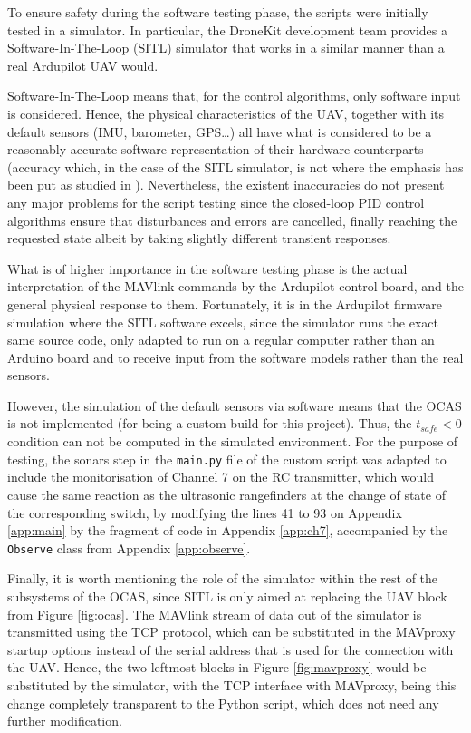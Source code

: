 To ensure safety during the software testing phase, the scripts were initially tested in a simulator.
In particular, the DroneKit development team provides a Software-In-The-Loop (SITL) simulator that works in a similar manner than a real Ardupilot UAV would.

Software-In-The-Loop means that, for the control algorithms, only software input is considered.
Hence, the physical characteristics of the UAV, together with its default sensors (IMU, barometer, GPS\ldots) all have what is considered to be a reasonably accurate software representation of their hardware counterparts (accuracy which, in the case of the SITL simulator, is not where the emphasis has been put as studied in \cite{vegaastorga2016}).
Nevertheless, the existent inaccuracies do not present any major problems for the script testing since the closed-loop PID control algorithms ensure that disturbances and errors are cancelled, finally reaching the requested state albeit by taking slightly different transient responses.

What is of higher importance in the software testing phase is the actual interpretation of the MAVlink commands by the Ardupilot control board, and the general physical response to them.
Fortunately, it is in the Ardupilot firmware simulation where the SITL software excels, since the simulator runs the exact same source code, only adapted to run on a regular computer rather than an Arduino board and to receive input from the software models rather than the real sensors.

However, the simulation of the default sensors via software means that the OCAS is not implemented (for being a custom build for this project).
Thus, the $t_{safe}<0$ condition can not be computed in the simulated environment.
For the purpose of testing, the sonars step in the \texttt{main.py} file of the custom script was adapted to include the monitorisation of Channel 7 on the RC transmitter, which would cause the same reaction as the ultrasonic rangefinders at the change of state of the corresponding switch, by modifying the lines 41 to 93 on Appendix \ref{app:main} by the fragment of code in Appendix \ref{app:ch7}, accompanied by the \texttt{Observe} class from Appendix \ref{app:observe}.

Finally, it is worth mentioning the role of the simulator within the rest of the subsystems of the OCAS, since SITL is only aimed at replacing the UAV block from Figure \ref{fig:ocas}.
The MAVlink stream of data out of the simulator is transmitted using the TCP protocol, which can be substituted in the MAVproxy startup options instead of the serial address that is used for the connection with the UAV.
Hence, the two leftmost blocks in Figure \ref{fig:mavproxy} would be substituted by the simulator, with the TCP interface with MAVproxy, being this change completely transparent to the Python script, which does not need any further modification.


